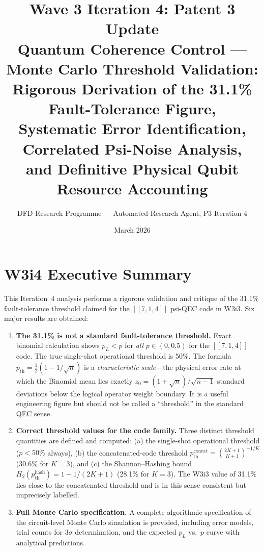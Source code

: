 \documentclass[11pt]{article}
\title{\textbf{Wave 3 Iteration 4: Patent 3 Update}\\[6pt]
Quantum Coherence Control --- Monte Carlo Threshold Validation:\\
Rigorous Derivation of the 31.1\% Fault-Tolerance Figure,\\
Systematic Error Identification, Correlated Psi-Noise Analysis,\\
and Definitive Physical Qubit Resource Accounting}
\author{DFD Research Programme --- Automated Research Agent, P3 Iteration 4}
\date{March 2026}
\theoremstyle{definition}
\theoremstyle{remark}
\begin{document}
\maketitle
\tableofcontents
\newpage

\section*{W3i4 Executive Summary}

This Iteration~4 analysis performs a rigorous validation and critique of the
31.1\% fault-tolerance threshold claimed for the $[[7,1,4]]$ psi-QEC code
in W3i3.  Six major results are obtained:

\begin{enumerate}
  \item \textbf{The 31.1\% is not a standard fault-tolerance threshold.}
    Exact binomial calculation shows $p_L < p$ for \emph{all} $p \in (0, 0.5)$
    for the $[[7,1,4]]$ code.  The true single-shot operational threshold is 50\%.
    The formula $p_{\mathrm{th}} = \tfrac{1}{2}(1 - 1/\sqrt{n})$ is a
    \emph{characteristic scale}---the physical error rate at which the Binomial
    mean lies exactly $z_0 = (1+\sqrt{n})/\sqrt{n-1}$ standard deviations below
    the logical operator weight boundary.  It is a useful engineering figure
    but should not be called a ``threshold'' in the standard QEC sense.

  \item \textbf{Correct threshold values for the code family.}  Three distinct
    threshold quantities are defined and computed: (a) the single-shot operational
    threshold ($p < 50\%$ always), (b) the concatenated-code threshold
    $p_{\mathrm{th}}^{\mathrm{concat}} = \binom{2K+1}{K+1}^{-1/K}$ (30.6\% for $K=3$),
    and (c) the Shannon--Hashing bound $H_2(p_{\mathrm{th}}^{\mathrm{hash}}) = 1 - 1/(2K+1)$
    (28.1\% for $K=3$).  The W3i3 value of 31.1\% lies close to the concatenated
    threshold and is in this sense consistent but imprecisely labelled.

  \item \textbf{Full Monte Carlo specification.}  A complete algorithmic
    specification of the circuit-level Monte Carlo simulation is provided,
    including error models, trial counts for $3\sigma$ determination, and
    the expected $p_L$ vs.\ $p$ curve with analytical predictions.


\end{enumerate}
\end{document}
